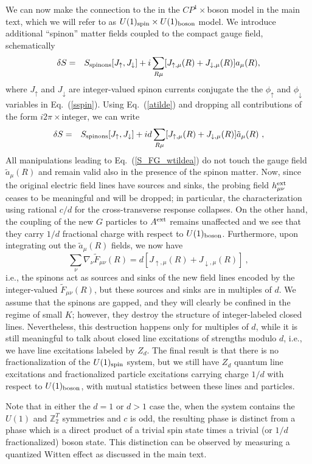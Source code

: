 \documentclass[prb,twocolumn]{revtex4-1}
\def\ztwot{\mathbb{Z}_2^T}
\def\up{\uparrow}
\def\dn{\downarrow}
\def\cG{{G}}
\def\Aext{A^{\rm ext}}
\def\hext{h^{\rm ext}}
\begin{document}
We can now make the connection to the in the $CP^1\times$boson model in the main text, which we will refer to as $U(1)_{\rm spin} \times U(1)_{\rm boson}$ model.  We introduce additional ``spinon'' matter fields coupled to the compact gauge field, schematically
\begin{eqnarray}
\delta S &=& S_{\rm spinons}[J_\up, J_\dn] + i \sum_{R\mu} [J_{\up, \mu}(R) + J_{\dn, \mu}(R)] a_\mu(R),\nonumber
\end{eqnarray}
where $J_\up$ and $J_\dn$ are integer-valued spinon currents conjugate the the $\phi_\up$ and $\phi_\dn$ variables in Eq.~(\ref{sspin}). Using Eq.~(\ref{atilde}) and dropping all contributions of the form $i 2\pi \times$integer, we can write
\begin{eqnarray}
\delta S &=& S_{\rm spinons}[J_\up, J_\dn] + i d \sum_{R\mu} [J_{\up, \mu}(R) + J_{\dn, \mu}(R)] \tilde{a}_\mu(R) ~,\nonumber
\end{eqnarray}
All manipulations leading to Eq.~(\ref{S_FG_wtildea}) do not touch the gauge field $\tilde{a}_\mu(R)$ and remain valid also in the presence of the spinon matter.  Now, since the original electric field lines have sources and sinks, the probing field $\hext_{\mu\nu}$ ceases to be meaningful and will be dropped; in particular, the characterization using rational $c/d$ for the cross-transverse response collapses.  On the other hand, the coupling of the new $\cG$ particles to $\Aext$ remains unaffected and we see that they carry $1/d$ fractional charge with respect to $U(1)_{\rm boson}$.  Furthermore, upon integrating out the $\tilde{a}_\mu(R)$ fields, we now have
\begin{equation}
\sum_\nu \nabla_\nu \tilde{F}_{\mu\nu}(R) = d [J_{\up, \mu}(R) + J_{\dn, \mu}(R)] ~,
\end{equation}
i.e., the spinons act as sources and sinks of the new field lines encoded by the integer-valued $\tilde{F}_{\mu\nu}(R)$, but these sources and sinks are in multiples of $d$.  We assume that the spinons are gapped, and they will clearly be confined in the regime of small $K$; however, they destroy the structure of integer-labeled closed lines.  Nevertheless, this destruction happens only for multiples of $d$, while it is still meaningful to talk about closed line excitations of strengths modulo $d$, i.e., we have line excitations labeled by $Z_d$.  The final result is that there is no fractionalization of the $U(1)_{\rm spin}$ system, but we still have $Z_d$ quantum line excitations and fractionalized particle excitations carrying charge $1/d$ with respect to $U(1)_{\rm boson}$, with mutual statistics between these lines and particles. 

Note that in either the $d=1$ or $d>1$ case the, when the system contains the $U(1)$ and $\ztwot$ symmetries and $c$ is odd, the resulting phase is distinct from a phase which is a direct product of a trivial spin state times a trivial (or $1/d$ fractionalized) boson state. This distinction can be observed by measuring a quantized Witten effect as discussed in the main text. 





\end{document}
